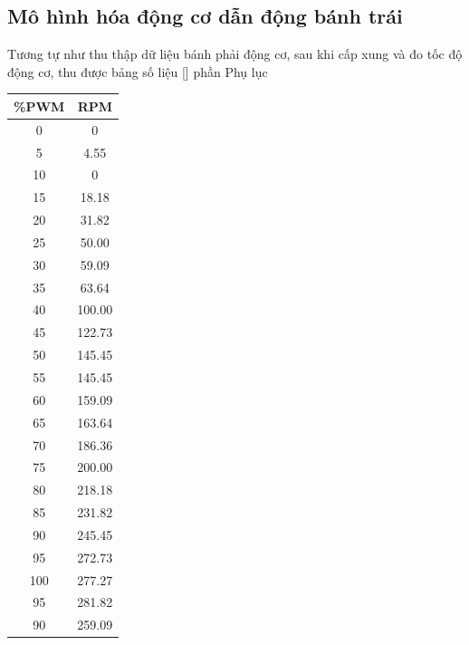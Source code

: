           \subsection{Mô hình hóa động cơ dẫn động bánh trái}
               \hspace*{0.6cm}Tương tự như thu thập dữ liệu bánh phải động cơ, sau khi cấp xung và đo tốc độ động cơ, thu được bảng số liệu [] phần Phụ lục
               \begin{table}[h!]
                    \centering
                    \begin{tabular}{|c|c|}
                         \hline
                         \textbf{\%PWM} & \textbf{RPM} \\
                         \hline
                         0   & 0 \\
                         5   & 4.55 \\
                         10  & 0 \\
                         15  & 18.18 \\
                         20  & 31.82 \\
                         25  & 50.00 \\
                         30  & 59.09 \\
                         35  & 63.64 \\
                         40  & 100.00 \\
                         45  & 122.73 \\
                         50  & 145.45 \\
                         55  & 145.45 \\
                         60  & 159.09 \\
                         65  & 163.64 \\
                         70  & 186.36 \\
                         75  & 200.00 \\
                         80  & 218.18 \\
                         85  & 231.82 \\
                         90  & 245.45 \\
                         95  & 272.73 \\
                         100 & 277.27 \\
                         95  & 281.82 \\
                         90  & 259.09 \\

\end{tabular}
\end{table}
